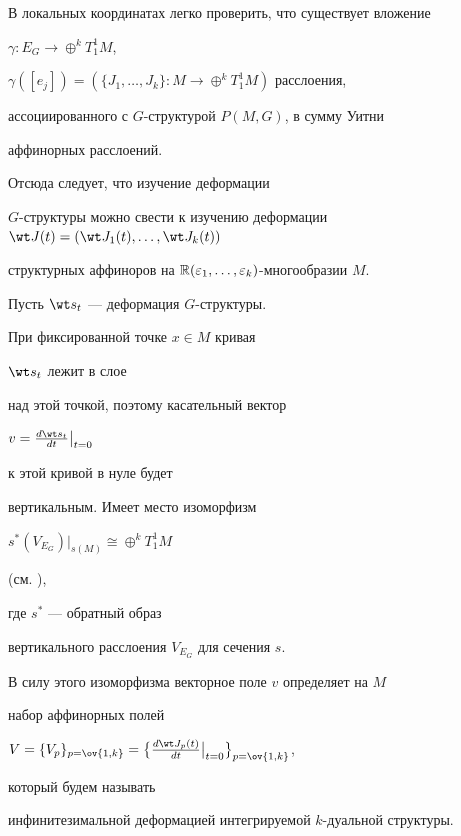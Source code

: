 В локальных координатах легко проверить, что существует вложение


$\gamma: E_G \to \oplus^k T_1^1 M$,


$\gamma([e_j])=(\{J_1, \dotsc,


J_k\}: M \to \oplus^k T_1^1 M)$ расслоения,


ассоциированного с $G$-структурой $P(M,G)$, в сумму Уитни


аффинорных расслоений.


Отсюда следует, что изучение деформации


$G$-структуры можно свести к изучению деформации $\wt J(t)=(\wt


J_1(t), \dotsc, \wt J_k(t))$


структурных аффиноров на ${\Bbb R}(\varepsilon_1, \dotsc,


\varepsilon_k)$-многообразии $M$.





Пусть $\wt s_t$ --- деформация $G$-структуры.


При фиксированной точке $x \in M$ кривая


$\wt s_t$ лежит в слое


над этой точкой, поэтому касательный вектор


$ v=\frac{d \wt s_t}{dt} \big|_{t=0}$


к этой кривой в нуле будет


вертикальным. Имеет место изоморфизм


$s^{\ast}(V_{E_G})\big|_{s(M)} \cong \oplus^kT^1_1M$


(см. \cite{Pomm}),


где $s^{\ast}$ --- обратный образ


вертикального расслоения  $V_{E_G}$ для сечения $s$.


В силу этого изоморфизма векторное поле $v$ определяет на $M$


набор аффинорных полей


$V=\{V_{p}\}_{p=\ov{1,k}}=


\big\{\frac{d\wt J_{p}(t)}{dt}


\big|_{t=0}\big\}_{p=\ov{1,k}}$,


который будем называть


инфинитезимальной деформацией интегрируемой $k$-дуальной структуры.





